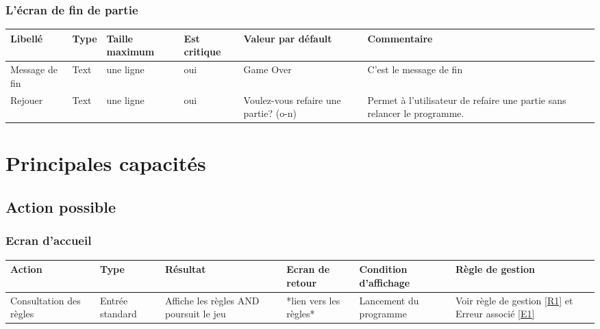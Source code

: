 \documentclass[12pt,a4paper]{article}
\begin{document}
			\subsubsection{L'écran de fin de partie}
					\hspace{-3cm}
					\begin{tabular}{|p{2.5cm}|p{1.5cm}|p{3cm}|p{2.5cm}|p{3cm}|p{3.5cm}|} %
						\hline
						Libellé & Type & Taille maximum & Est critique & Valeur par défault & Commentaire \\
						\hline \hline
						Message de fin & Text & une ligne & oui & Game Over & C'est le message de fin \\
						\hline
						Rejouer & Text & une ligne & oui & Voulez-vous refaire une partie? (o-n)& Permet à l'utilisateur de refaire une partie sans relancer le programme. \\
						\hline
					\end{tabular}
					\label{Informations présentes sur l'écran d'accueil}
			
		\section{Principales capacités}
		\subsection{Action possible}
			\subsubsection{Ecran d'accueil}
					\hspace{-3cm}
					\begin{tabular}{|p{3cm}|p{2.5cm}|p{3cm}|p{2.5cm}|p{3cm}|p{2cm}|} %
						\hline
						Action & Type & Résultat & Ecran de retour & Condition d'affichage & Règle de gestion \\
						\hline \hline
						Consultation des règles & Entrée standard & Affiche les règles AND poursuit le jeu & *lien vers les règles* & Lancement du programme &  Voir règle de gestion \ref{R1} et Erreur associé \ref{E1} \\
						\hline
					\end{tabular}
					\label{Action possible sur l'écran d'accueil}
					
\end{document}
